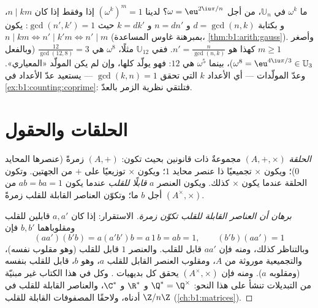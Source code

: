\begin{example}\label{ex:b1:structures:orderU12}
ما  $\omega^k$ في $\mathbb U_n$، من أجل $\omega =
\eu^{2\iu\pi/n}$؟ لدينا $(\omega^k)^m = 1$ إذا وفقط إذا كان $n \mid km$، و
بكتابة $d = \gcd(n, k)$ و $n = dn'$ و $k = dk'$ حيث $\gcd(n', k')
= 1$: يكون $n \mid km \iff n' \mid k'm \iff n' \mid m$ (بمبرهنة غاوس
المساعدة، \cref{thm:b1:arith:gauss}). وأصغر $m \geq 1$ كهذا هو
$n' = \frac{n}{\gcd(n,k)}$. ففي $\mathbb U_{12}$ مثلًا، 
$\omega^8$ هي $\frac{12}{\gcd(12,8)} = 3$ (وبالفعل
$\omega^8 = \eu^{4\iu\pi/3} \in \mathbb U_3$)، بينما  $\omega^5$
هي $12$: فهو يولّد  كلها، وإن لم يكن
المولّد «المعياري». وعدّ المولّدات --- أي الأعداد $k$
التي تحقق $\gcd(k, n) = 1$ --- يستعيد عدّ الأعداد  في
\cref{ex:b1:counting:coprime}: فتلتقي نظرية الزمر بالعدّ.
\end{example}

\section{الحلقات والحقول}

\begin{definition}[الحلقة]\label{def:b1:structures:ring}
\emph{الحلقة} $(A, +, \times)$ مجموعةٌ ذات قانونين بحيث
تكون: $(A, +)$ زمرةً  (عنصرها المحايد $0$)؛ ويكون $\times$
تجميعيًا ذا عنصر محايد $1$؛ ويكون $\times$ توزيعيًا على $+$ من
الجهتين. وتكون الحلقة \emph{} عندما يكون $\times$ كذلك. ويكون
العنصر $a$ \emph{قابلًا للقلب} عندما يكون $ab = ba = 1$
من أجل $b$ ما؛ وتكوّن العناصر القابلة للقلب زمرةً $(A^\times, \times)$.
\end{definition}

\begin{proof}[برهان أن العناصر القابلة للقلب تكوّن زمرة]
الاستقرار: إذا كان $a, a'$ قابلين للقلب ومقلوباهما $b, b'$ فإن
\[
(aa')(b'b) = a(a'b')b = a\,1\,b = ab = 1,
\qquad (b'b)(aa') = 1
\]
وبالتناظر كذلك، ومنه فإن $aa'$ قابل للقلب. والعنصر $1$ قابل للقلب (وهو
مقلوب نفسه)، والتجميعية موروثة من $A$، ومقلوب
العنصر القابل للقلب $a$، وهو $b$، قابل للقلب بنفسه (ومقلوبه $a$).
ومنه فإن $(A^\times, \times)$ يحقق كل بديهيات . وكل 
في هذا الكتاب غير مبنيّة من التبديلات تنشأ على هذا النحو:
$\Q^* = \Q^\times$ و $\R^*$ و $\C^*$، والعناصر القابلة للقلب في $\Z/n\Z$ أدناه،
ولاحقًا المصفوفات القابلة للقلب (\cref{ch:b1:matrices}).
\end{proof}

